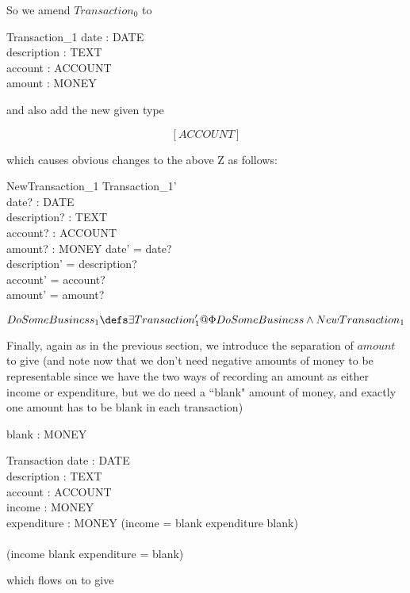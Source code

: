 \documentclass[11pt]{amsart}
\begin{document}
So we amend $Transaction_0$  to

\begin{schema}{Transaction_1}
date : DATE\\
description : TEXT\\
account : ACCOUNT\\
amount : MONEY
\end{schema}

and also add the new given type

\[
[ACCOUNT]
\]

which causes obvious changes to the above Z as follows:

\begin{schema}{NewTransaction_1}
Transaction_1'\\
date? : DATE\\
description? : TEXT\\
account? : ACCOUNT\\ 
amount? : MONEY
\where
date' = date?\\
description' = description?\\
account' = account?\\
amount' = amount?
\end{schema}

\[
DoSomeBusiness_1 \defs \exists Transaction_1' @ \Phi DoSomeBusiness \land New Transaction_1
\]

Finally, again as in the previous section, we introduce the separation of $amount$ to give (and note now that we don't need negative amounts of money to be representable since we have the two ways of recording an amount as either income or expenditure, but we do need a ``blank" amount of money, and exactly one amount has to be blank in each transaction)

\begin{axdef}
blank : MONEY
\end{axdef}

\begin{schema}{Transaction}
date : DATE\\
description : TEXT\\
account : ACCOUNT\\
income : MONEY\\
expenditure : MONEY
\where
(income = blank \land expenditure \neq blank) \\
\lor\\
(income \neq blank \land expenditure = blank)
\end{schema}

which flows on to give
\end{document}
